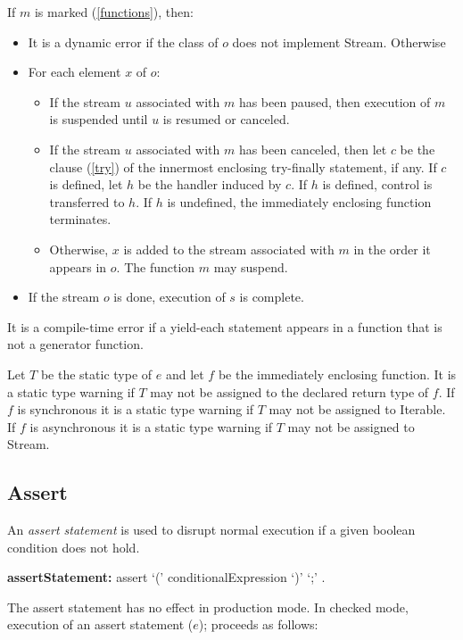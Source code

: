 \documentclass{article}
\newcommand{\code}[1]{{\sf #1}}
\begin{document}
\LMHash{}
If $m$ is marked \ASYNC* (\ref{functions}), then:
\begin{itemize}
\item  It is a dynamic error if the class of $o$ does not implement \code{Stream}. Otherwise
\item For each element $x$ of $o$:
\begin{itemize}
\item
If the stream $u$ associated with $m$ has been paused,  then execution of $m$ is suspended until $u$ is resumed or canceled.
 \item
If the stream $u$ associated with $m$ has been canceled, then let $c$ be the \FINALLY{} clause (\ref{try}) of the innermost enclosing try-finally statement, if any. If $c$ is defined,  let $h$ be the handler induced by $c$. If $h$ is defined, control is transferred to $h$. If $h$ is undefined, the immediately enclosing function terminates.
\item
Otherwise,  $x$ is added to the stream associated with $m$ in the order it appears in $o$.  The function $m$ may suspend.
\end{itemize}
\item If the stream $o$ is done, execution of $s$ is complete. 
\end{itemize}


\LMHash{}
It is a compile-time error if a yield-each statement appears in a function that is not a generator function.

\LMHash{}
Let $T$ be the static type of $e$ and let $f$ be the immediately enclosing function.  It is a static type warning if $T$ may not be assigned to the declared return type of $f$.  If $f$ is synchronous it is a static  type warning if $T$ may not be assigned to \code{Iterable}.  If $f$ is asynchronous it is a static  type warning if $T$ may not be assigned to \code{Stream}. 


\subsection{ Assert}

\LMHash{}
An {\em assert statement} is used to disrupt normal execution if a given boolean condition does not hold.

\begin{grammar}
{\bf assertStatement:}
   assert `(' conditionalExpression `)' `{\escapegrammar ;}'
      .
\end{grammar}
      
\LMHash{}
The assert statement has no effect in production mode. In checked mode, execution of an assert statement \code{\ASSERT{}($e$);} proceeds as follows:
\end{document}
